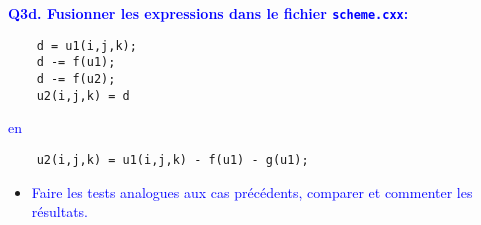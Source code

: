 \documentclass{beamer}
\begin{document}
\begin{frame}[fragile]
	\textcolor{blue}{\bf Q3d. Fusionner les expressions dans le fichier {\tt scheme.cxx}:}
	\begin{lstlisting}
	d = u1(i,j,k);
	d -= f(u1);
	d -= f(u2);
	u2(i,j,k) = d
	\end{lstlisting}
	
	\textcolor{blue}{en} 
	\begin{lstlisting}
	u2(i,j,k) = u1(i,j,k) - f(u1) - g(u1);
	\end{lstlisting}
	
	\begin{itemize}
		\item \textcolor{blue}{Faire les tests analogues aux cas pr\'ec\'edents, comparer et commenter les r\'esultats.}
	\end{itemize}
\end{frame}
\end{document}
